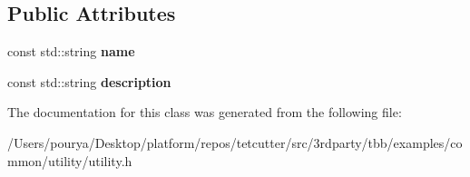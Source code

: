 \subsection*{Public Attributes}
\begin{DoxyCompactItemize}
\item 
\hypertarget{classutility_1_1internal_1_1type__base_a752ffac1416c7b43ed2a656e0c445b4e}{}const std\+::string {\bfseries name}\label{classutility_1_1internal_1_1type__base_a752ffac1416c7b43ed2a656e0c445b4e}

\item 
\hypertarget{classutility_1_1internal_1_1type__base_acb263ffe29b32513c9d5889d0175a830}{}const std\+::string {\bfseries description}\label{classutility_1_1internal_1_1type__base_acb263ffe29b32513c9d5889d0175a830}

\end{DoxyCompactItemize}


The documentation for this class was generated from the following file\+:\begin{DoxyCompactItemize}
\item 
/\+Users/pourya/\+Desktop/platform/repos/tetcutter/src/3rdparty/tbb/examples/common/utility/utility.\+h\end{DoxyCompactItemize}
